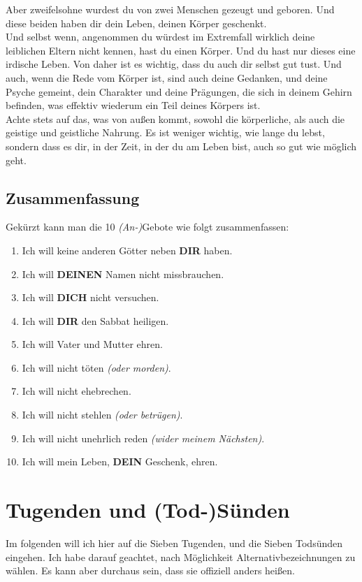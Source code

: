 \documentclass[12pt,a5paper]{article}
\newcommand{\Deinen}[0]{\textbf{DEINEN}}
\newcommand{\Dein}[0]{\textbf{DEIN}}
\newcommand{\Dich}[0]{\textbf{DICH}}
\newcommand{\Dir}[0]{\textbf{DIR}}
\begin{document}
\begin{itemize}
					Aber zweifelsohne wurdest du von zwei Menschen gezeugt und geboren.
					Und diese beiden haben dir dein Leben,
					deinen K\"orper geschenkt.
					\\
					Und selbst wenn,
					angenommen du w\"urdest im Extremfall wirklich deine leiblichen Eltern nicht kennen,
					hast du einen K\"orper.
					Und du hast nur dieses eine irdische Leben.
					Von daher ist es wichtig,
					dass du auch dir selbst gut tust.
					Und auch,
					wenn die Rede vom K\"orper ist,
					sind auch deine Gedanken,
					und deine Psyche gemeint,
					dein Charakter und deine Pr\"agungen,
					die sich in deinem Gehirn befinden,
					was effektiv wiederum ein Teil deines K\"orpers ist.
					\\
					Achte stets auf das,
					was von au{\ss}en kommt,
					sowohl die k\"orperliche,
					als auch die geistige und geistliche Nahrung.
					Es ist weniger wichtig,
					wie lange du lebst,
					sondern dass es dir,
					in der Zeit,
					in der du am Leben bist,
					auch so gut wie m\"oglich geht.
		\end{itemize}
	
	\newpage
	\subsection{Zusammenfassung}
		Gek\"urzt kann man die 10 \textit{(An-)}Gebote wie folgt zusammenfassen:
		\\
		\begin{enumerate}[nosep]
			\item Ich will keine anderen G\"otter neben {\Dir} haben.
			\item Ich will {\Deinen} Namen nicht missbrauchen.
			\item Ich will {\Dich} nicht versuchen.
			\item Ich will {\Dir} den Sabbat heiligen.
			\item Ich will Vater und Mutter ehren.
			\item Ich will nicht t\"oten \textit{(oder morden)}.
			\item Ich will nicht ehebrechen.
			\item Ich will nicht stehlen \textit{(oder betr\"ugen)}.
			\item Ich will nicht unehrlich reden \textit{(wider meinem N\"achsten)}.
			\item Ich will mein Leben, {\Dein} Geschenk, ehren.
		\end{enumerate}
	
	\newpage
	\section{Tugenden und (Tod-)S\"unden}
		Im folgenden will ich hier auf die Sieben Tugenden,
		und die Sieben Tods\"unden eingehen.
		Ich habe darauf geachtet,
		nach M\"oglichkeit Alternativbezeichnungen zu w\"ahlen.
		Es kann aber durchaus sein,
		dass sie offiziell anders hei{\ss}en.
	
\end{document}
